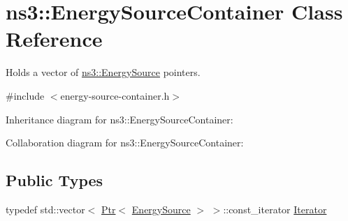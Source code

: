 \hypertarget{classns3_1_1EnergySourceContainer}{}\section{ns3\+:\+:Energy\+Source\+Container Class Reference}
\label{classns3_1_1EnergySourceContainer}


Holds a vector of \hyperlink{classns3_1_1EnergySource}{ns3\+::\+Energy\+Source} pointers.  




{\ttfamily \#include $<$energy-\/source-\/container.\+h$>$}



Inheritance diagram for ns3\+:\+:Energy\+Source\+Container\+:


Collaboration diagram for ns3\+:\+:Energy\+Source\+Container\+:
\subsection*{Public Types}
\begin{DoxyCompactItemize}
\item 
typedef std\+::vector$<$ \hyperlink{classns3_1_1Ptr}{Ptr}$<$ \hyperlink{classns3_1_1EnergySource}{Energy\+Source} $>$ $>$\+::const\+\_\+iterator \hyperlink{classns3_1_1EnergySourceContainer_a4aef37787572d18785778ee20b003b2a}{Iterator}
\end{DoxyCompactItemize}
